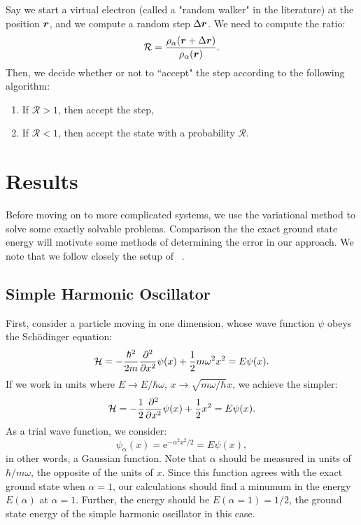 \documentclass[12pt]{article}
\newcommand{\e}{\mathrm{e}}
\numberwithin{equation}{section}
\begin{document}
Say we start a virtual electron (called a "random walker" in the literature) at the position $\vb*r$, and we compute a random step $\Delta \vb*r$.  We need to compute the ratio:
\begin{equation}
    \mathcal{R} = \frac{\rho_\alpha(\vb*r + \Delta \vb*r)}{\rho_\alpha(\vb*r)}.
\end{equation}
Then, we decide whether or not to ``accept" the step according to the following algorithm:
\begin{enumerate}
    \item If $\mathcal{R} > 1$, then accept the step,
    \item If $\mathcal{R} < 1$, then accept the state with a probability $\mathcal{R}$.
\end{enumerate}

\section{Results}
Before moving on to more complicated systems, we use the variational method to solve some exactly solvable problems.  Comparison the the exact ground state energy will motivate some methods of determining the error in our approach.  We note that we follow closely the setup of ~\cite{jensen}.
\subsection{Simple Harmonic Oscillator}
First, consider a particle moving in one dimension, whose wave function $\psi$ obeys the Sch\"{o}dinger equation:
\begin{equation}
    \mathcal H = -\frac{\hbar^2}{2m} \pdv[2]{x}\psi(x) + \frac12m \omega^2 x^2 = E\psi(x).
\end{equation}
If we work in units where $E \rightarrow E / \hbar \omega$, $x \rightarrow \sqrt{m\omega / \hbar} x$, we achieve the simpler:
\begin{equation}
    \mathcal H = -\frac{1}{2} \pdv[2]{x}\psi(x) + \frac12 x^2 = E\psi(x).
\end{equation}
As a trial wave function, we consider:
\[ \psi_\alpha(x) = \e ^{-\alpha^2 x^2 / 2} = E \psi(x),\]
in other words, a Gaussian function.  Note that $\alpha$ should be measured in units of $\hbar/m\omega$, the opposite of the units of $x$. Since this function agrees with the exact ground state when $\alpha = 1$, our calculations should find a minumum in the energy $E\left( \alpha \right)$ at $\alpha = 1$.  Further, the energy should be $E(\alpha = 1) = 1/2$, the ground state energy of the simple harmonic oscillator in this case.
\end{document}
